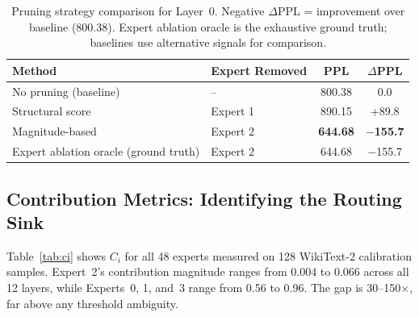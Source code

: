 \documentclass{article}
\begin{document}
\begin{table}[t]
\caption{Pruning strategy comparison for Layer~0. Negative $\Delta$PPL = improvement over baseline (800.38). Expert ablation oracle is the exhaustive ground truth; baselines use alternative signals for comparison.}
\label{tab:baselines}
\centering
\small
\begin{tabular}{llcc}
\toprule
\textbf{Method} & \textbf{Expert Removed} & \textbf{PPL} & \textbf{$\Delta$PPL} \\
\midrule
No pruning (baseline)                  & {--}     & 800.38          & 0.0       \\
Structural score        & Expert 1 & 890.15          & +89.8     \\
Magnitude-based     & Expert 2 & \textbf{644.68} & \textbf{$-$155.7} \\
Expert ablation oracle (ground truth) & Expert 2 & 644.68       & $-$155.7  \\
\bottomrule
\end{tabular}
\end{table}

\subsection{Contribution Metrics: Identifying the Routing Sink}
\label{sec:contrib_results}

Table~\ref{tab:ci} shows $C_i$ for all 48 experts measured on 128 WikiText-2 calibration samples. Expert~2's contribution magnitude ranges from 0.004 to 0.066 across all 12 layers, while Experts~0, 1, and~3 range from 0.56 to 0.96. The gap is 30--150$\times$, far above any threshold ambiguity.
\end{document}
